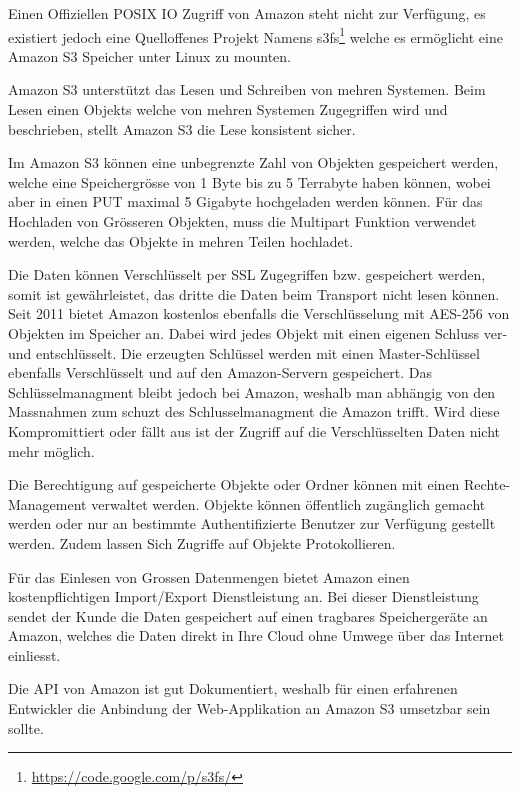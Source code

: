 Einen Offiziellen POSIX IO Zugriff von Amazon steht nicht zur Verfügung, es existiert jedoch eine Quelloffenes Projekt Namens s3fs\footnote{\url{https://code.google.com/p/s3fs/}} welche es ermöglicht eine Amazon S3 Speicher unter Linux zu mounten. \cite{S3fs}

Amazon S3 unterstützt das Lesen und Schreiben von mehren Systemen. Beim Lesen einen Objekts welche von mehren Systemen Zugegriffen wird und beschrieben, stellt Amazon S3 die Lese konsistent sicher.\cite{Amazon2012a}

Im Amazon S3 können eine unbegrenzte Zahl von Objekten gespeichert werden, welche eine Speichergrösse von 1 Byte bis zu 5 Terrabyte haben können, wobei aber in einen PUT maximal 5 Gigabyte hochgeladen werden können. Für das Hochladen von Grösseren Objekten, muss die Multipart Funktion verwendet werden, welche das Objekte in mehren Teilen hochladet.\cite{Amazon2012b}

Die Daten können Verschlüsselt per SSL Zugegriffen bzw. gespeichert werden, somit ist gewährleistet, das dritte die Daten beim Transport nicht lesen können. Seit 2011 bietet Amazon kostenlos ebenfalls die Verschlüsselung mit AES-256 von Objekten im Speicher an. Dabei wird jedes Objekt mit einen eigenen Schluss ver- und entschlüsselt. Die erzeugten Schlüssel werden mit einen Master-Schlüssel ebenfalls Verschlüsselt und auf den Amazon-Servern gespeichert. Das Schlüsselmanagment bleibt jedoch bei Amazon, weshalb man abhängig von den Massnahmen zum schuzt des Schlusselmanagment die Amazon trifft. Wird diese Kompromittiert oder fällt aus ist der Zugriff auf die Verschlüsselten Daten nicht mehr möglich.\cite{RobertLippert2011}

Die Berechtigung auf gespeicherte Objekte oder Ordner können mit einen Rechte-Management verwaltet werden. Objekte können öffentlich zugänglich gemacht werden oder nur an bestimmte Authentifizierte Benutzer zur Verfügung gestellt werden. Zudem lassen Sich Zugriffe auf Objekte Protokollieren.\cite{Amazon2012b}

Für das Einlesen von Grossen Datenmengen bietet Amazon einen kostenpflichtigen Import/Export Dienstleistung an. Bei dieser Dienstleistung sendet der Kunde die Daten gespeichert auf  einen tragbares Speichergeräte an Amazon, welches die Daten direkt in Ihre Cloud ohne Umwege über das Internet einliesst.

Die API von Amazon ist gut Dokumentiert, weshalb für einen erfahrenen Entwickler die Anbindung der Web-Applikation an Amazon S3 umsetzbar sein sollte.

